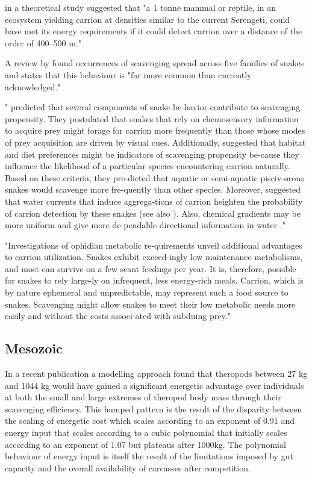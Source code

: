 \documentclass[a4paper,12pt]{article}
\begin{document}
\cite{ruxton2004obligate} in a theoretical study suggested that "a 1 tonne mammal or reptile, in an ecosystem yielding carrion at densities similar to the current Serengeti, could have met its energy requirements if it could detect carrion over a distance of the order of 400–500 m."

A review by \cite{devault2002scavenging} found occurrences of scavenging spread across five families of snakes and states that this behaviour is "far more common than currently acknowledged."


"\cite{sazima1990necrofagia} predicted that  several components  of  snake  be-havior contribute to scavenging propensity. They  postulated  that  snakes  that  rely  on chemosensory information to acquire prey might forage  for  carrion  more  frequently than  those  whose  modes  of prey acquisition are driven by visual cues. Additionally, \cite{sazima1990necrofagia} suggested that habitat and diet preferences might be indicators of scavenging   propensity   be-cause  they  influence  the  likelihood of a particular species encountering carrion naturally. Based on these criteria, they pre-dicted that aquatic or semi-aquatic pisciv-orous snakes  would  scavenge  more  fre-quently than other species. Moreover, \cite{sazima1990necrofagia}  suggested that water currents that induce  aggrega-tions of carrion heighten the probability of carrion detection by these snakes (see also \cite{savitzky1992laboratory}).  Also,  chemical  gradients may  be  more  uniform  and  give  more  de-pendable  directional information in water \citep{sazima1990necrofagia}." \citep{devault2002scavenging} 



"Investigations of ophidian metabolic re-quirements unveil additional advantages to carrion  utilization.  Snakes  exhibit  exceed-ingly  low  maintenance  metabolisms,  and most  can  survive  on  a  few  scant  feedings per year. It  is, therefore, possible for snakes to rely large-ly  on  infrequent,  less  energy-rich  meals. Carrion, which is by nature ephemeral and unpredictable, may represent such a food source  to  snakes.  Scavenging  might  allow snakes to meet their low metabolic needs more  easily  and  without  the  costs  associ-ated with subduing prey." \citep{devault2002scavenging} 

\subsection*{Mesozoic}
In a recent publication a modelling approach found that theropods between 27 kg and 1044 kg would have gained a significant energetic advantage over individuals at both the small and large extremes of theropod body mass through their scavenging efficiency. 
This humped pattern is the result of the disparity between the scaling of energetic cost which scales according to an exponent of 0.91 and energy input that scales according to a cubic polynomial that initially scales according to an exponent of 1.07 but plateaus after 1000kg. 
The polynomial behaviour of energy input is itself the result of the limitations imposed by gut capacity and the overall availability of carcasses after competition.
\end{document}
